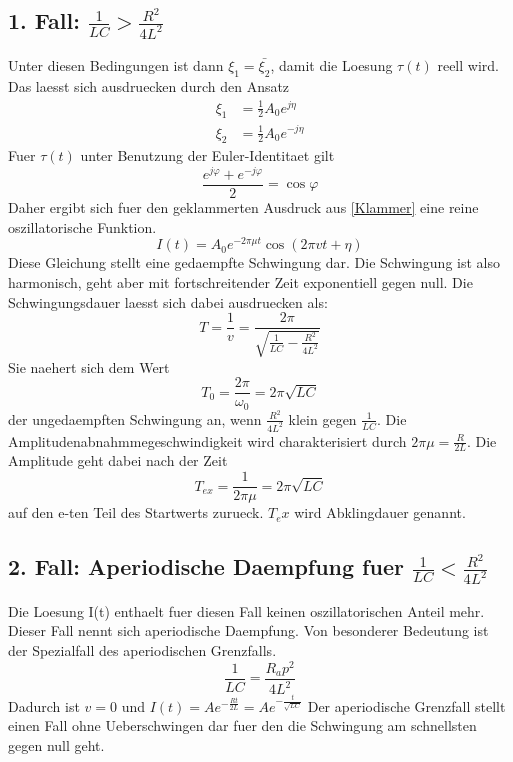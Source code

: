 \documentclass[titlepage=firstcover, captions=tableheading]{scrartcl}
\begin{document}
\subsection{1. Fall: $\frac{1}{LC}>\frac{R^2}{4L^2}$}
Unter diesen Bedingungen ist dann $\xi_1 =\bar{\xi_2}$, damit die Loesung $\tau(t)$ reell wird.
Das laesst sich ausdruecken durch den Ansatz
\begin{align}
    \xi_1&=\frac{1}{2}A_0e^{j\eta}\nonumber\\
    \xi_2&=\frac{1}{2}A_0e^{-j\eta}\nonumber
\end{align}
Fuer $\tau(t)$ unter Benutzung der Euler-Identitaet gilt
\begin{equation}
    \frac{e^{j\varphi}+e^{-j\varphi}}{2}=\cos\varphi \nonumber
\end{equation}
Daher ergibt sich fuer den geklammerten Ausdruck aus \ref{Klammer} eine reine oszillatorische Funktion.
\begin{equation}
    I(t)=A_0e^{-2\pi\mu t}\cos(2\pi vt+\eta)\nonumber
\end{equation}
Diese Gleichung stellt eine gedaempfte Schwingung dar. Die Schwingung ist also harmonisch, geht aber mit fortschreitender Zeit exponentiell gegen null. Die Schwingungsdauer laesst sich dabei ausdruecken als:
\begin{equation}
    T=\frac{1}{v}=\frac{2\pi}{\sqrt{\frac{1}{LC}-\frac{R^2}{4L^2}}}\nonumber
\end{equation}
Sie naehert sich dem Wert
\begin{equation}
    T_0=\frac{2\pi}{\omega_0}=2\pi\sqrt{LC}\nonumber
\end{equation}
der ungedaempften Schwingung an, wenn $\frac{R^2}{4L^2}$ klein gegen $\frac{1}{LC}$.
Die Amplitudenabnahmmegeschwindigkeit wird charakterisiert durch $2\pi\mu=\frac{R}{2L}$.
Die Amplitude geht dabei nach der Zeit 
\begin{equation}
    T_{ex}=\frac{1}{2\pi\mu}=2\pi\sqrt{LC}\nonumber
\end{equation}
auf den e-ten Teil des Startwerts zurueck. $T_ex$ wird Abklingdauer genannt.
\subsection{2. Fall: Aperiodische Daempfung fuer $\frac{1}{LC}<\frac{R^2}{4L^2}$}
Die Loesung I(t) enthaelt fuer diesen Fall keinen oszillatorischen Anteil mehr. Dieser Fall nennt sich aperiodische Daempfung. Von besonderer Bedeutung ist der Spezialfall des aperiodischen Grenzfalls.
\begin{equation}
    \frac{1}{LC}=\frac{R_ap^2}{4L^2}\nonumber
\end{equation}
Dadurch ist $v=0$ und $I(t)=Ae^{-\frac{Rt}{2L}}=Ae^{-\frac{t}{\sqrt{LC}}}$
Der aperiodische Grenzfall stellt einen Fall ohne Ueberschwingen dar fuer den die Schwingung am schnellsten gegen null geht.
\end{document}
